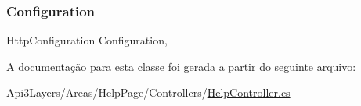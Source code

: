 \subsubsection{\texorpdfstring{Configuration}{Configuration}}
{\footnotesize\ttfamily Http\+Configuration Configuration\hspace{0.3cm}{\ttfamily [get]}, {}}



A documentação para esta classe foi gerada a partir do seguinte arquivo\+:\begin{DoxyCompactItemize}
\item 
Api3\+Layers/\+Areas/\+Help\+Page/\+Controllers/\hyperlink{HelpController_8cs}{Help\+Controller.\+cs}\end{DoxyCompactItemize}
